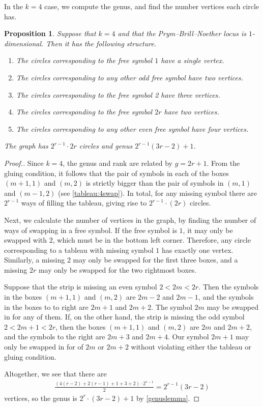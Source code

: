 \documentclass[11pt,reqno]{amsart}
\theoremstyle{definition}
\theoremstyle{problem}
\theoremstyle{plain}
\newtheorem{proposition}[definition]{Proposition}
\theoremstyle{remark}
\theoremstyle{theorem}
\numberwithin{equation}{section}
\numberwithin{figure}{section}
\theoremstyle{definition}
\theoremstyle{problem}
\theoremstyle{plain}
\begin{document}
In the $k=4$ case, we compute the genus, and find the number vertices each circle has.

\begin{proposition}
  \label{prop:k4dim1}
  Suppose that $k=4$ and that the Prym--Brill--Noether locus is $1$-dimensional. Then it has the following structure. 
  \begin{enumerate}[label=(\roman*)]
      \item The circles corresponding to the free symbol $1$ have a single vertex.
      \item The circles corresponding to any other odd free symbol have two vertices.
      \item The circles corresponding to the free symbol 2 have three vertices.
      \item The circles corresponding to the free symbol $2r$ have two vertices.
      \item The circles corresponding to any other even free symbol have four vertices.
  \end{enumerate}
  The graph has $2^{r-1}\cdot 2r$ circles and genus $2^{r-1}(3r-2)+1$.
\end{proposition}

\begin{proof}[Proof.]
 Since $k=4$, the genus and rank are related by $g=2r+1$. From the gluing condition, it follows that the pair of symbols in each of the boxes $(m+1,1)$ and $(m,2)$ is strictly bigger than the pair of symbols in $(m,1)$ and $(m-1,2)$ (see \cref{tableau:4swap}). In total, for any missing symbol there are $2^{r-1}$ ways of filling the tableau, giving rise to $2^{r-1}\cdot (2r)$ circles. 
 
 Next, we calculate the number of vertices in the graph, by finding the number of ways of swapping in a free symbol.
  If the free symbol is $1$, it may only be swapped with $2$, which must be in the bottom left corner. Therefore, any circle corresponding to a tableau with missing symbol $1$ has exactly one vertex. Similarly, a missing $2$ may only be swapped for the first three boxes, and a missing $2r$ may only be swapped for the two rightmost boxes.
  
Suppose that the strip is missing an even symbol $2<2m<2r$. Then the symbols in the boxes $(m+1,1)$ and $(m,2)$ are $2m-2$ and $2m-1$, and the symbols in the boxes to to right are $2m+1$ and $2m+2$. The symbol $2m$ may be swapped in for  any of them. 
If, on the other hand, the strip is missing the odd symbol $2<2m+1<2r$, then the boxes  $(m+1,1)$ and $(m,2)$ are $2m$ and $2m+2$, and the symbols to the right are $2m+3$ and $2m+4$. Our symbol $2m+1$ may only be swapped in for of $2m$ or $2m+2$ without violating either the tableau or gluing condition. 

Altogether, we see that there are 
  \begin{gather*}
\frac{(4(r-2) + 2(r-1) + 1 + 3 + 2) \cdot 2^{r-1}}{2} = 2^{r-1}(3r-2)
\end{gather*}
vertices,  so the genus is $2^r\cdot (3r-2) + 1$  by \cref{genuslemma}. 
\end{proof}
\end{document}
